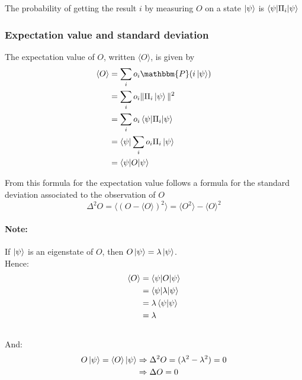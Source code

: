 \documentclass{article}
\begin{document}
The probability of getting the result $i$ by measuring $O$ on a state $\ket{\psi}$ is $\braket{\psi|\Pi_i|\psi}$
\subsubsection{Expectation value and standard deviation}

The expectation value of $O$, written $\langle O\rangle$, is given by
\begin{equation}
    \begin{aligned}
        \langle O\rangle
            & = \sum_i o_i \mathbbm{P}(i\ket{\psi}) \\
            & = \sum_i o_i \|\Pi_i\ket{\psi}\|^2 \\
            & = \sum_i o_i \braket{\psi|\Pi_i|\psi} \\
            & = \bra{\psi}\sum_i o_i \Pi_i \ket{\psi} \\
            & = \braket{\psi | O |\psi}
    \end{aligned}
\end{equation}

From this formula for the expectation value follows a formula for the standard deviation associated to the observation of $O$
\begin{equation}
    \Delta^2 O = \langle(O - \langle O \rangle)^2\rangle = \langle O^2 \rangle - \langle O \rangle^2
\end{equation}

\paragraph{Note:} If $\ket{\psi}$ is an eigenstate of $O$, then $O\ket{\psi} = \lambda \ket{\psi}$.
\\
Hence:
\begin{equation}
    \begin{aligned}
        \braket{O}
            & = \braket{\psi | O | \psi} \\
            & = \braket{\psi | \lambda | \psi} \\
            & = \lambda\braket{\psi|\psi } \\
            & = \lambda
    \end{aligned}
\end{equation}
\\
And:
\begin{equation}
    \begin{aligned}
        O\ket{\psi} = \braket{O} \ket{\psi}
            & \Rightarrow \Delta^2 O = (\lambda^2 - \lambda^2) = 0 \\
            & \Rightarrow \Delta O = 0
    \end{aligned}
\end{equation}
\end{document}
